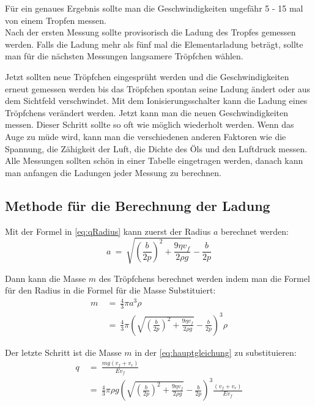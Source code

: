 Für ein genaues Ergebnis sollte man die Geschwindigkeiten ungefähr 5 - 15 mal von einem Tropfen messen. \\

Nach der ersten Messung sollte provisorisch die Ladung des Tropfes gemessen werden. Falls die Ladung mehr als fünf mal die Elementarladung beträgt, sollte man für die nächsten Messungen langsamere Tröpfchen wählen. 

Jetzt sollten neue Tröpfchen eingesprüht werden und die Geschwindigkeiten erneut gemessen werden bis das Tröpfchen spontan seine Ladung ändert oder aus dem Sichtfeld verschwindet. Mit dem Ionisierungsschalter kann die Ladung eines Tröpfchens verändert werden. Jetzt kann man die neuen Geschwindigkeiten messen. Dieser Schritt sollte so oft wie möglich wiederholt werden. Wenn das Auge zu müde wird, kann man die verschiedenen anderen Faktoren wie die Spannung, die Zähigkeit der Luft, die Dichte des Öls und den Luftdruck messen. Alle Messungen sollten schön in einer Tabelle eingetragen werden, danach kann man anfangen die Ladungen jeder Messung zu berechnen.

\subsection{Methode für die Berechnung der Ladung}\label{sub:methodeBerechnung}
Mit der Formel in \autoref{eq:qRadius} kann zuerst der Radius $a$ berechnet werden:
\begin{equation*}
	a \ = \ \sqrt{\left( \frac{b}{2p}\right)^2 + \frac{9\eta v_f}{2\rho g}} - \frac{b}{2p}
\end{equation*}

\noindent Dann kann die Masse $m$ des Tröpfchens berechnet werden indem man die Formel für den Radius in die Formel für die Masse Substituiert:
\begin{equation*}
	\begin{split}
		m & \ = \ \frac{4}{3}\pi a^3 \rho \\
		& \ = \ \frac{4}{3}\pi \left( \sqrt{\left( \frac{b}{2p}\right)^2 + \frac{9\eta v_f}{2\rho g}} - \frac{b}{2p} \right)^3 \rho
	\end{split}
\end{equation*}

\noindent Der letzte Schritt ist die Masse $m$ in der \autoref{eq:hauptgleichung} zu substituieren:
\begin{equation*}
	\begin{split}
		q & \ = \ \frac{m g (v_f + v_r)}{Ev_f} \\
		& \ = \ \frac{4}{3} \pi \rho g \left( \sqrt{\left( \frac{b}{2p}\right)^2 + \frac{9\eta v_f}{2\rho g}} - \frac{b}{2p} \right)^3 \frac{(v_f + v_r)}{Ev_f}
	\end{split}
\end{equation*}

